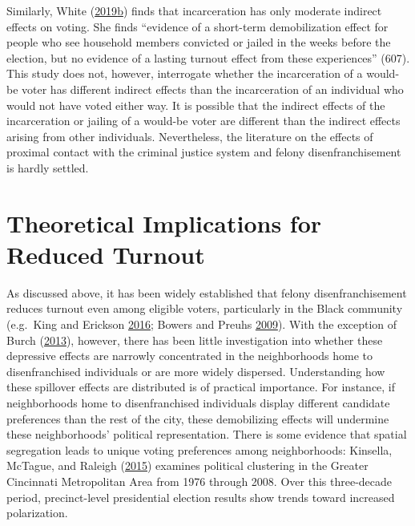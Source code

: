 \documentclass[12pt,]{article}
\begin{document}
Similarly, White (\protect\hyperlink{ref-White2019a}{2019}\protect\hyperlink{ref-White2019a}{b}) finds that incarceration has only moderate indirect effects on voting. She finds ``evidence of a short-term demobilization effect for people who see household members convicted or jailed in the weeks before the election, but no evidence of a lasting turnout effect from these experiences'' (607). This study does not, however, interrogate whether the incarceration of a would-be voter has different indirect effects than the incarceration of an individual who would not have voted either way. It is possible that the indirect effects of the incarceration or jailing of a would-be voter are different than the indirect effects arising from other individuals. Nevertheless, the literature on the effects of proximal contact with the criminal justice system and felony disenfranchisement is hardly settled.

\hypertarget{theoretical-implications-for-reduced-turnout}{%
\section*{Theoretical Implications for Reduced Turnout}\label{theoretical-implications-for-reduced-turnout}}

As discussed above, it has been widely established that felony disenfranchisement reduces turnout even among eligible voters, particularly in the Black community (e.g.~King and Erickson \protect\hyperlink{ref-King2016}{2016}; Bowers and Preuhs \protect\hyperlink{ref-Bowers2009}{2009}). With the exception of Burch (\protect\hyperlink{ref-Burch2013}{2013}), however, there has been little investigation into whether these depressive effects are narrowly concentrated in the neighborhoods home to disenfranchised individuals or are more widely dispersed. Understanding how these spillover effects are distributed is of practical importance. For instance, if neighborhoods home to disenfranchised individuals display different candidate preferences than the rest of the city, these demobilizing effects will undermine these neighborhoods' political representation. There is some evidence that spatial segregation leads to unique voting preferences among neighborhoods: Kinsella, McTague, and Raleigh (\protect\hyperlink{ref-Kinsella2015}{2015}) examines political clustering in the Greater Cincinnati Metropolitan Area from 1976 through 2008. Over this three-decade period, precinct-level presidential election results show trends toward increased polarization.
\end{document}
